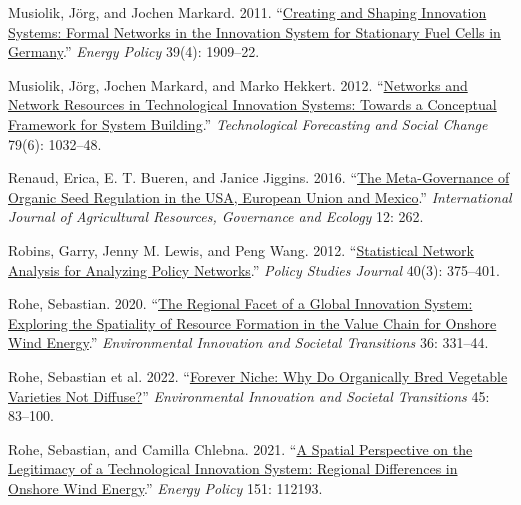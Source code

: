 \documentclass[twoside,12pt,final]{ucthesis-CA2012}
\newlength{\cslhangindent}
\newenvironment{CSLReferences}[2] %
 {%
  \setlength{\parindent}{0pt}
  \ifodd #1 \everypar{\setlength{\hangindent}{\cslhangindent}}\ignorespaces\fi
  \ifnum #2 > 0
  \setlength{\parskip}{#2\baselineskip}
  \fi
 }%
 {}
\begin{document}
\begin{ucmainmatter}
\begin{CSLReferences}{1}{0}
\leavevmode{}%
Musiolik, Jörg, and Jochen Markard. 2011. {``\href{https://doi.org/10.1016/j.enpol.2010.12.052}{Creating and Shaping Innovation Systems: Formal Networks in the Innovation System for Stationary Fuel Cells in Germany}.''} \emph{Energy Policy} 39(4): 1909--22.

\leavevmode{}%
Musiolik, Jörg, Jochen Markard, and Marko Hekkert. 2012. {``\href{https://doi.org/10.1016/J.TECHFORE.2012.01.003}{Networks and Network Resources in Technological Innovation Systems: Towards a Conceptual Framework for System Building}.''} \emph{Technological Forecasting and Social Change} 79(6): 1032--48.

\leavevmode{}%
Renaud, Erica, E. T. Bueren, and Janice Jiggins. 2016. {``\href{https://doi.org/10.1504/IJARGE.2016.078311}{The Meta-Governance of Organic Seed Regulation in the USA, European Union and Mexico}.''} \emph{International Journal of Agricultural Resources, Governance and Ecology} 12: 262.

\leavevmode{}%
Robins, Garry, Jenny M. Lewis, and Peng Wang. 2012. {``\href{https://doi.org/10.1111/j.1541-0072.2012.00458.x}{Statistical Network Analysis for Analyzing Policy Networks}.''} \emph{Policy Studies Journal} 40(3): 375--401.

\leavevmode{}%
Rohe, Sebastian. 2020. {``\href{https://doi.org/10.1016/j.eist.2020.02.002}{The Regional Facet of a Global Innovation System: Exploring the Spatiality of Resource Formation in the Value Chain for Onshore Wind Energy}.''} \emph{Environmental Innovation and Societal Transitions} 36: 331--44.

\leavevmode{}%
Rohe, Sebastian et al. 2022. {``\href{https://doi.org/10.1016/j.eist.2022.09.004}{Forever Niche: Why Do Organically Bred Vegetable Varieties Not Diffuse?}''} \emph{Environmental Innovation and Societal Transitions} 45: 83--100.

\leavevmode{}%
Rohe, Sebastian, and Camilla Chlebna. 2021. {``\href{https://doi.org/10.1016/j.enpol.2021.112193}{A Spatial Perspective on the Legitimacy of a Technological Innovation System: Regional Differences in Onshore Wind Energy}.''} \emph{Energy Policy} 151: 112193.


\end{CSLReferences}
\end{ucmainmatter}
\end{document}
